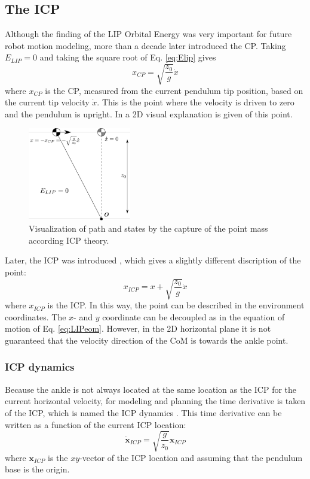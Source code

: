 \subsection{The \acf{ICP}}
Although the finding of the \ac{LIP} Orbital Energy was very important for future robot motion modeling, more than a decade later \cite{pratt2006capture} introduced the \ac{CP}. Taking $E_{LIP}=0$ and taking the square root of Eq.  \eqref{eq:Elip} gives
\begin{equation}
x_{CP}=\sqrt{ \frac{z_0}{g}}\dot{x} 
\label{eq:cp}
\end{equation}
where $x_{CP}$ is the \ac{CP}, measured from the current pendulum tip position, based on the current tip velocity $\dot{x}$. This is the point where the velocity is driven to zero and the pendulum is upright. In  a \ac{2D} visual explanation is given of this point.
\begin{figure}[h]
\centering
\includegraphics[width=0.4\textwidth]{STYLESTUFF/2DICP.png}
\caption{Visualization of path and states by the capture of the point mass according \ac{ICP} theory.}
\label{fig:2dicp}
\end{figure}
Later, the \ac{ICP} was introduced \cite{koolen2012capturability}, which gives a slightly different discription of the point:
\begin{equation}
x_{ICP}=x+\sqrt{ \frac{z_0}{g}}\dot{x} 
\label{eq:icp}
\end{equation}
where $x_{ICP}$ is the \ac{ICP}. In this way, the point can be described in the environment coordinates.
The $x$- and $y$ coordinate can be decoupled as in the equation of motion of Eq. \eqref{eq:LIPeom}. However, in the \ac{2D} horizontal plane it is not guaranteed that the velocity direction of the \ac{CoM} is towards the ankle point. 
\subsubsection{\ac{ICP} dynamics}
Because the ankle is not always located at the same location as the \ac{ICP} for the current horizontal velocity, for modeling and planning the time derivative is taken of the \ac{ICP}, which is named the \ac{ICP} dynamics \cite{koolen2012capturability}. This time derivative can be written as a function of the current \ac{ICP} location:
\begin{equation}
\boldsymbol{\dot{x}}_{ICP}=\sqrt{ \frac{g}{z_0}}\boldsymbol{x}_{ICP} 
\label{eq:cp}
\end{equation}
where $\boldsymbol{x}_{ICP}$ is the $xy$-vector of the \ac{ICP} location and assuming that the pendulum base is the origin.

